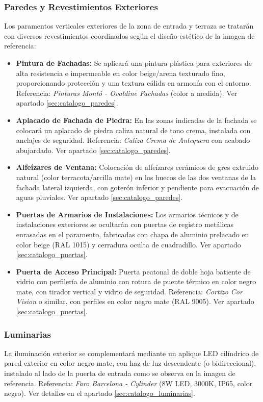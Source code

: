 \documentclass[12pt,a4paper]{article}
\begin{document}
\subsubsection{Paredes y Revestimientos Exteriores}
Los paramentos verticales exteriores de la zona de entrada y terraza se tratarán con diversos revestimientos coordinados según el diseño estético de la imagen de referencia:
\begin{itemize}
    \item \textbf{Pintura de Fachadas:} Se aplicará una pintura plástica para exteriores de alta resistencia e impermeable en color beige/arena texturado fino, proporcionando protección y una textura cálida en armonía con el entorno. Referencia: \textit{Pinturas Montó - Ovaldine Fachadas} (color a medida). Ver apartado \ref{sec:catalogo_paredes}.
    \item \textbf{Aplacado de Fachada de Piedra:} En las zonas indicadas de la fachada se colocará un aplacado de piedra caliza natural de tono crema, instalada con anclajes de seguridad. Referencia: \textit{Caliza Crema de Antequera} con acabado abujardado. Ver apartado \ref{sec:catalogo_paredes}.
    \item \textbf{Alfeízares de Ventana:} Colocación de alfeízares cerámicos de gres extruido natural (color terracota/arcilla mate) en los huecos de las dos ventanas de la fachada lateral izquierda, con goterón inferior y pendiente para evacuación de aguas pluviales. Ver apartado \ref{sec:catalogo_paredes}.
    \item \textbf{Puertas de Armarios de Instalaciones:} Los armarios técnicos y de instalaciones exteriores se ocultarán con puertas de registro metálicas enrasadas en el paramento, fabricadas con chapa de aluminio prelacado en color beige (RAL 1015) y cerradura oculta de cuadradillo. Ver apartado \ref{sec:catalogo_puertas}.
    \item \textbf{Puerta de Acceso Principal:} Puerta peatonal de doble hoja batiente de vidrio con perfilería de aluminio con rotura de puente térmico en color negro mate, con tirador vertical y vidrio de seguridad. Referencia: \textit{Cortizo Cor Vision} o similar, con perfiles en color negro mate (RAL 9005). Ver apartado \ref{sec:catalogo_puertas}.
\end{itemize}

\subsubsection{Luminarias}
La iluminación exterior se complementará mediante un aplique LED cilíndrico de pared exterior en color negro mate, con haz de luz descendente (o bidireccional), instalado al lado de la puerta de entrada como se observa en la imagen de referencia. Referencia: \textit{Faro Barcelona - Cylinder} (8W LED, 3000K, IP65, color negro). Ver detalles en el apartado \ref{sec:catalogo_luminarias}.
\end{document}
